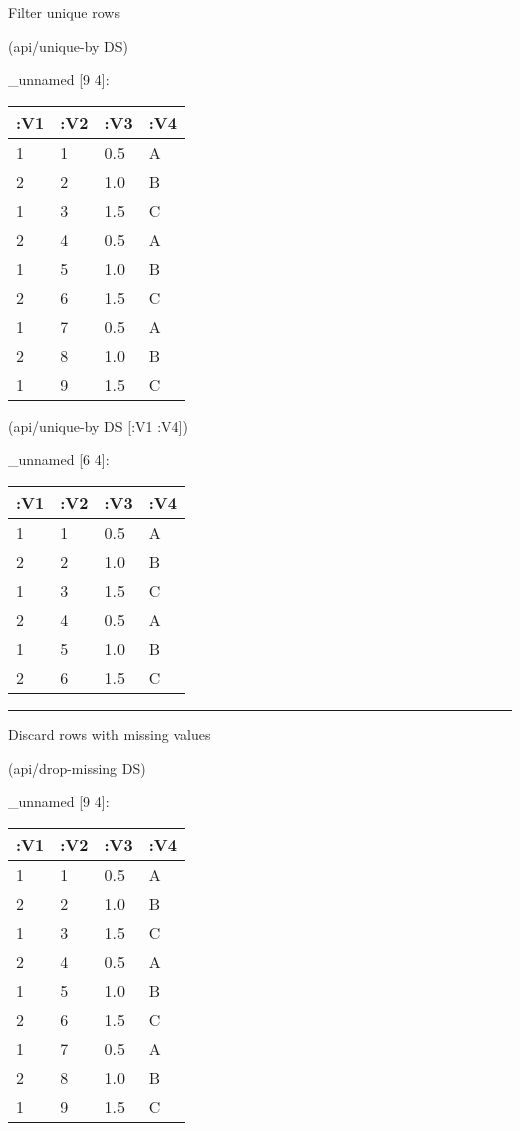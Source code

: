 \documentclass[]{article}
\newenvironment{Shaded}{\begin{snugshade}}{\end{snugshade}}
\newcommand{\AttributeTok}[1]{\textcolor[rgb]{0.77,0.63,0.00}{#1}}
\newcommand{\NormalTok}[1]{#1}
\begin{document}
Filter unique rows

\begin{Shaded}
\begin{Highlighting}[]
\NormalTok{(api/unique-by DS)}
\end{Highlighting}
\end{Shaded}

\_unnamed {[}9 4{]}:

\begin{longtable}[]{@{}llll@{}}
\toprule
:V1 & :V2 & :V3 & :V4\tabularnewline
\midrule
\endhead
1 & 1 & 0.5 & A\tabularnewline
2 & 2 & 1.0 & B\tabularnewline
1 & 3 & 1.5 & C\tabularnewline
2 & 4 & 0.5 & A\tabularnewline
1 & 5 & 1.0 & B\tabularnewline
2 & 6 & 1.5 & C\tabularnewline
1 & 7 & 0.5 & A\tabularnewline
2 & 8 & 1.0 & B\tabularnewline
1 & 9 & 1.5 & C\tabularnewline
\bottomrule
\end{longtable}

\begin{Shaded}
\begin{Highlighting}[]
\NormalTok{(api/unique-by DS [}\AttributeTok{:V1} \AttributeTok{:V4}\NormalTok{])}
\end{Highlighting}
\end{Shaded}

\_unnamed {[}6 4{]}:

\begin{longtable}[]{@{}llll@{}}
\toprule
:V1 & :V2 & :V3 & :V4\tabularnewline
\midrule
\endhead
1 & 1 & 0.5 & A\tabularnewline
2 & 2 & 1.0 & B\tabularnewline
1 & 3 & 1.5 & C\tabularnewline
2 & 4 & 0.5 & A\tabularnewline
1 & 5 & 1.0 & B\tabularnewline
2 & 6 & 1.5 & C\tabularnewline
\bottomrule
\end{longtable}

\begin{center}\rule{0.5\linewidth}{0.5pt}\end{center}

Discard rows with missing values

\begin{Shaded}
\begin{Highlighting}[]
\NormalTok{(api/drop-missing DS)}
\end{Highlighting}
\end{Shaded}

\_unnamed {[}9 4{]}:

\begin{longtable}[]{@{}llll@{}}
\toprule
:V1 & :V2 & :V3 & :V4\tabularnewline
\midrule
\endhead
1 & 1 & 0.5 & A\tabularnewline
2 & 2 & 1.0 & B\tabularnewline
1 & 3 & 1.5 & C\tabularnewline
2 & 4 & 0.5 & A\tabularnewline
1 & 5 & 1.0 & B\tabularnewline
2 & 6 & 1.5 & C\tabularnewline
1 & 7 & 0.5 & A\tabularnewline
2 & 8 & 1.0 & B\tabularnewline
1 & 9 & 1.5 & C\tabularnewline
\bottomrule
\end{longtable}
\end{document}
